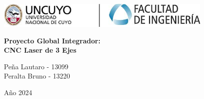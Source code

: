 \documentclass{article}
\begin{document}
\begin{titlepage}
    \centering

    \includegraphics[width=0.8\textwidth]{img/fing.jpeg}\par\vspace{1cm}
    \vspace{2cm}
    {\Huge \textbf{Proyecto Global Integrador:}\\[0.5cm]
    \textbf{CNC Laser de 3 Ejes}\vspace{2cm}}
    
    {\Large Peña Lautaro - 13099\\
    Peralta Bruno - 13220\par}\vspace{0.5cm}
    
    {Año 2024\par}
\end{titlepage}

\newpage
\tableofcontents
\newpage
\end{document}
